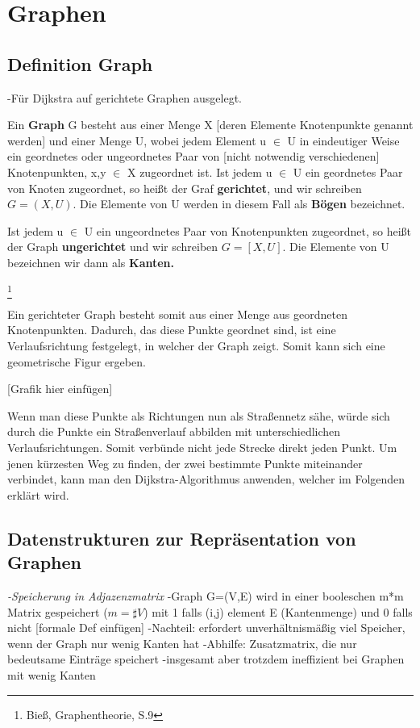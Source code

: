 \chapter{Graphen}

\section{Definition Graph}


-Für Dijkstra auf gerichtete Graphen ausgelegt.

\begin{theorem}
Ein \textbf{Graph} G besteht aus einer Menge X [deren Elemente Knotenpunkte genannt werden] und einer Menge U, wobei jedem Element u $\in$ U in eindeutiger Weise ein geordnetes oder ungeordnetes Paar von [nicht notwendig verschiedenen] Knotenpunkten, x,y $\in$ X zugeordnet ist.
Ist jedem u $\in$ U ein geordnetes Paar von Knoten zugeordnet, so heißt der Graf \textbf{gerichtet}, und wir schreiben 
	$G= (X, U)$.
Die Elemente von U werden in diesem Fall als \textbf{Bögen} bezeichnet.

Ist jedem u $\in$ U ein ungeordnetes Paar von Knotenpunkten zugeordnet, so heißt der Graph \textbf{ungerichtet} und wir schreiben 
	$G=[X,U]$. 
Die Elemente von U bezeichnen wir dann als \textbf{Kanten.}
\end{theorem} \footnote{Bieß, Graphentheorie, S.9}


Ein gerichteter Graph besteht somit aus einer Menge aus geordneten Knotenpunkten. Dadurch, das diese Punkte geordnet sind, ist eine Verlaufsrichtung festgelegt, in welcher der Graph zeigt.
Somit kann sich eine geometrische Figur ergeben.


[Grafik hier einfügen]


Wenn man diese Punkte als Richtungen nun als Straßennetz sähe, würde sich durch die Punkte ein Straßenverlauf abbilden mit unterschiedlichen Verlaufsrichtungen.
Somit verbünde nicht jede Strecke direkt jeden Punkt. Um jenen kürzesten Weg zu finden, der zwei bestimmte Punkte miteinander verbindet, kann man den Dijkstra-Algorithmus anwenden, welcher im Folgenden erklärt wird.



\section{Datenstrukturen zur Repräsentation von Graphen}

\emph{-Speicherung in Adjazenzmatrix}
-Graph G=(V,E) wird in einer booleschen m*m Matrix gespeichert ($m = \sharp V$)
 mit 1 falls (i,j) element E (Kantenmenge) und 0 falls nicht
 [formale Def einfügen]
 -Nachteil: erfordert unverhältnismäßig viel Speicher, wenn der Graph nur wenig    	  Kanten hat
 -Abhilfe: Zusatzmatrix, die nur bedeutsame Einträge speichert
 -insgesamt aber trotzdem ineffizient bei Graphen mit wenig Kanten
 
